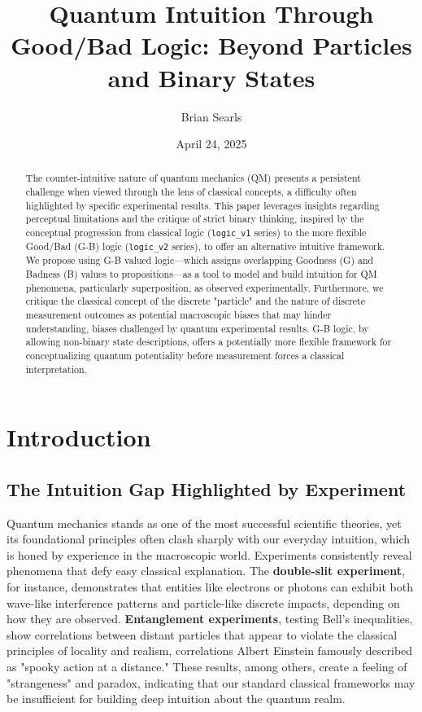 \documentclass{article}
\title{Quantum Intuition Through Good/Bad Logic: Beyond Particles and Binary States}
\author{Brian Searls} %
\date{April 24, 2025} %
\begin{document}
\maketitle

\begin{abstract}
The counter-intuitive nature of quantum mechanics (QM) presents a persistent challenge when viewed through the lens of classical concepts, a difficulty often highlighted by specific experimental results. This paper leverages insights regarding perceptual limitations and the critique of strict binary thinking, inspired by the conceptual progression from classical logic (\texttt{logic\_v1} series) to the more flexible Good/Bad (G-B) logic (\texttt{logic\_v2} series), to offer an alternative intuitive framework. We propose using G-B valued logic---which assigns overlapping Goodness (G) and Badness (B) values to propositions---as a tool to model and build intuition for QM phenomena, particularly superposition, as observed experimentally. Furthermore, we critique the classical concept of the discrete "particle" and the nature of discrete measurement outcomes as potential macroscopic biases that may hinder understanding, biases challenged by quantum experimental results. G-B logic, by allowing non-binary state descriptions, offers a potentially more flexible framework for conceptualizing quantum potentiality before measurement forces a classical interpretation.
\end{abstract}

\section{Introduction}

\subsection{The Intuition Gap Highlighted by Experiment}

Quantum mechanics stands as one of the most successful scientific theories, yet its foundational principles often clash sharply with our everyday intuition, which is honed by experience in the macroscopic world. Experiments consistently reveal phenomena that defy easy classical explanation. The \textbf{double-slit experiment}, for instance, demonstrates that entities like electrons or photons can exhibit both wave-like interference patterns and particle-like discrete impacts, depending on how they are observed. \textbf{Entanglement experiments}, testing Bell's inequalities, show correlations between distant particles that appear to violate the classical principles of locality and realism, correlations Albert Einstein famously described as "spooky action at a distance." These results, among others, create a feeling of "strangeness" and paradox, indicating that our standard classical frameworks may be insufficient for building deep intuition about the quantum realm.
\end{document}
